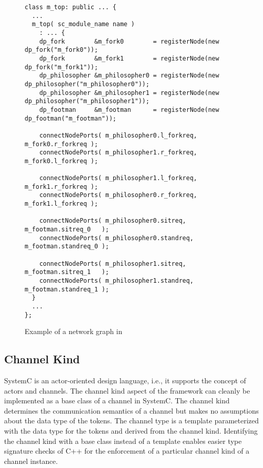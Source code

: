 \begin{figure}[h]
\centering
\begin{verbatim}
class m_top: public ... {
  ...
  m_top( sc_module_name name )
    : ... {
    dp_fork        &m_fork0        = registerNode(new dp_fork("m_fork0"));
    dp_fork        &m_fork1        = registerNode(new dp_fork("m_fork1"));
    dp_philosopher &m_philosopher0 = registerNode(new dp_philosopher("m_philosopher0"));
    dp_philosopher &m_philosopher1 = registerNode(new dp_philosopher("m_philosopher1"));
    dp_footman     &m_footman      = registerNode(new dp_footman("m_footman"));
    
    connectNodePorts( m_philosopher0.l_forkreq, m_fork0.r_forkreq );
    connectNodePorts( m_philosopher1.r_forkreq, m_fork0.l_forkreq );
    
    connectNodePorts( m_philosopher1.l_forkreq, m_fork1.r_forkreq );
    connectNodePorts( m_philosopher0.r_forkreq, m_fork1.l_forkreq );
    
    connectNodePorts( m_philosopher0.sitreq,   m_footman.sitreq_0   );
    connectNodePorts( m_philosopher0.standreq, m_footman.standreq_0 );

    connectNodePorts( m_philosopher1.sitreq,   m_footman.sitreq_1   );
    connectNodePorts( m_philosopher1.standreq, m_footman.standreq_1 );
  }
  ...
};
\end{verbatim}
\caption{\label{dining-philosophers-csp-systemoc}
  Example of a network graph in \SysteMoC}
\end{figure}



\subsection{Channel Kind}

SystemC is an actor-oriented design language, i.e., it supports the concept
of actors and channels. The channel kind aspect of the \SysteMoC{}
framework can cleanly be implemented as a base class of a channel in SystemC.
The channel kind determines the communication semantics of a channel but
makes no assumptions about the data type of the tokens.
The channel type is a template parameterized
with the data type for the tokens and derived from the channel kind.
Identifying the channel kind with a base class instead of a template enables
easier type signature checks of C++ for the enforcement of a particular
channel kind of a channel instance.


